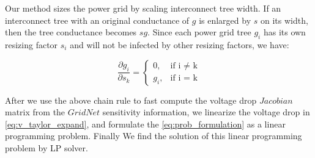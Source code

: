 
Our method sizes the power grid by scaling interconnect tree width. If an interconnect tree with an original conductance of $g$ is enlarged by $s$ on its width, then the tree conductance becomes $sg$. Since each power grid tree $g_{i}$ has its own resizing factor $s_{i}$ and will not be infected by other resizing factors, we have:

\begin{equation}
\label{eq:partial_g}
\frac{\partial g_{i}}{\partial s_{k}}=
    \begin{cases}
        0,      &\mbox{if i $\neq$ k} \\ 
        g_{i},  &\mbox{if i = k} 
    \end{cases}
\end{equation}

After we use the above chain rule to fast compute the
voltage drop $Jacobian$ matrix from the $GridNet$ sensitivity
information,  we linearize the voltage drop in
\eqref{eq:v_taylor_expand}, and formulate the
\eqref{eq:prob_formulation} as a linear programming problem. Finally
We find the solution of this linear programming problem by LP solver.



